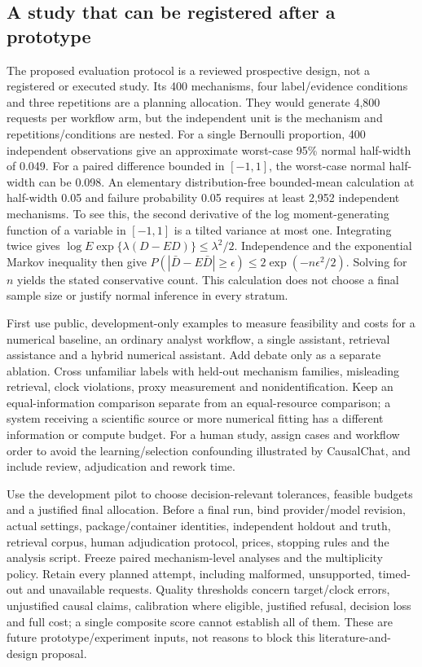\hypertarget{a-study-that-can-be-registered-after-a-prototype}{%
\subsection{A study that can be registered after a
prototype}\label{a-study-that-can-be-registered-after-a-prototype}}

The proposed evaluation protocol is a reviewed prospective design, not a
registered or executed study. Its 400 mechanisms, four label/evidence
conditions and three repetitions are a planning allocation. They would
generate 4,800 requests per workflow arm, but the independent unit is
the mechanism and repetitions/conditions are nested. For a single
Bernoulli proportion, 400 independent observations give an approximate
worst-case 95\% normal half-width of 0.049. For a paired difference
bounded in \([-1,1]\), the worst-case normal half-width can be 0.098. An
elementary distribution-free bounded-mean calculation at half-width 0.05
and failure probability 0.05 requires at least 2,952 independent
mechanisms. To see this, the second derivative of the log
moment-generating function of a variable in \([-1,1]\) is a tilted
variance at most one. Integrating twice gives
\(\log E\exp\{\lambda(D-ED)\}\leq\lambda^2/2\). Independence and the
exponential Markov inequality then give
\(P(|\bar D-E\bar D|\geq\epsilon)\leq2\exp(-n\epsilon^2/2)\). Solving
for \(n\) yields the stated conservative count. This calculation does
not choose a final sample size or justify normal inference in every
stratum.\citep{exec14_evaluation_oracle}

First use public, development-only examples to measure feasibility and
costs for a numerical baseline, an ordinary analyst workflow, a single
assistant, retrieval assistance and a hybrid numerical assistant. Add
debate only as a separate ablation. Cross unfamiliar labels with
held-out mechanism families, misleading retrieval, clock violations,
proxy measurement and nonidentification. Keep an equal-information
comparison separate from an equal-resource comparison; a system
receiving a scientific source or more numerical fitting has a different
information or compute budget. For a human study, assign cases and
workflow order to avoid the learning/selection confounding illustrated
by CausalChat, and include review, adjudication and rework time.

Use the development pilot to choose decision-relevant tolerances,
feasible budgets and a justified final allocation. Before a final run,
bind provider/model revision, actual settings, package/container
identities, independent holdout and truth, retrieval corpus, human
adjudication protocol, prices, stopping rules and the analysis script.
Freeze paired mechanism-level analyses and the multiplicity policy.
Retain every planned attempt, including malformed, unsupported,
timed-out and unavailable requests. Quality thresholds concern
target/clock errors, unjustified causal claims, calibration where
eligible, justified refusal, decision loss and full cost; a single
composite score cannot establish all of them. These are future
prototype/experiment inputs, not reasons to block this
literature-and-design proposal.


